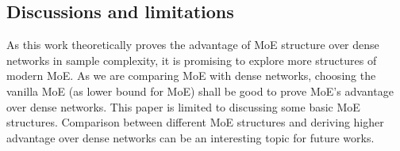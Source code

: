 \documentclass{article}
\newcommand{\E}{\mathbb{E}}
\newcommand{\1}{\mathbb{I}}
\newcommand{\norm}[1]{\left\lVert#1\right\rVert}
\newcommand{\calO}{\mathcal{O}}
\begin{document}

\subsection{Discussions and limitations}
As this work theoretically proves the advantage of MoE structure over dense networks in sample complexity, it is promising to explore more structures of modern MoE. As we are comparing MoE with dense networks, choosing the vanilla MoE (as lower bound for MoE) shall be good to prove MoE's advantage over dense networks. This paper is limited to discussing some basic MoE structures. Comparison between different MoE structures and deriving higher advantage over dense networks can be an interesting topic for future works. 


\end{document}
